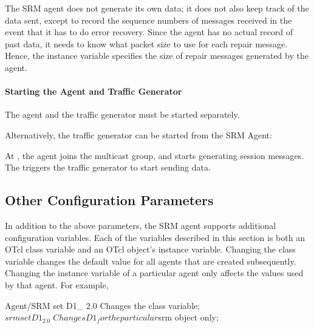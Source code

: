 The SRM agent does not generate its own data;
it does not also keep track of the data sent,
except to record the sequence numbers of messages received
in the event that it has to do error recovery.
Since the agent has no actual record of past data,
it needs to know what packet size to use for each repair message.
Hence, the instance variable  specifies the size
of repair messages generated by the agent.

\paragraph{Starting the Agent and Traffic Generator}
The agent and the traffic generator must be started separately.
\begin{program}
        {\bfseries{}}
        {\bfseries{}}
\end{program}
Alternatively, the traffic generator can be started from the SRM Agent:
\begin{program}
        {\bfseries{}}
\end{program}
At , the agent joins the multicast group, and 
starts generating session messages.
The  triggers the traffic generator to start sending
data.

\subsection{Other Configuration Parameters}
\label{sec:config-param}

In addition to the above parameters,
the SRM agent supports additional configuration variables.
Each of the variables described in this section is
both an OTcl class variable and an OTcl object's instance variable.
Changing the class variable changes the default value
for all agents that are created subsequently.
Changing the instance variable of a particular agent
only affects the values used by that agent.
For example,
\begin{program}
                Agent/SRM set D1_ 2.0 \; Changes the class variable;
                $srm set D1_ 2.0        \; Changes D1_ for the particular $srm object only;
\end{program}

